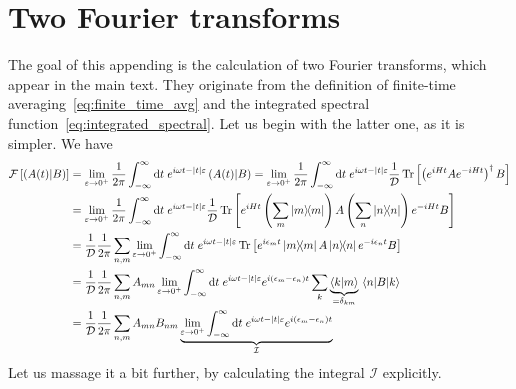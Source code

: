 \chapter{Two Fourier transforms\label{app:fourier}}
\thispagestyle{chapterBeginStyle}
The goal of this appending is the calculation of two Fourier transforms, which appear in the main text.
They originate from the definition of finite-time averaging~\eqref{eq:finite_time_avg} and
the integrated spectral function~\eqref{eq:integrated_spectral}. Let us begin with the latter one,
as it is simpler. We have
\begin{align}
    \mathcal{F}\left[\hs{A(t)}{B}\right] &= \lim _{\varepsilon \to 0^+} \frac{1}{2 \pi} \int_{-\infty}^{\infty} \mathrm{d} t 
    \; e^{i \omega t-|t| \varepsilon}\hs{A(t)}{B} = \lim _{\varepsilon \to 0^+} \frac{1}{2 \pi}
    \int_{-\infty}^{\infty} \mathrm{d} t \; e^{i \omega t-|t| \varepsilon} \frac{1}{\dimension}
    \Tr\left[\left(e^{iHt}Ae^{-iHt}\right)^{\dagger}B\right] \nonumber\\
    &=\lim _{\varepsilon \to 0^+} \frac{1}{2 \pi}
    \int_{-\infty}^{\infty} \mathrm{d} t \; e^{i \omega t-|t| \varepsilon} \frac{1}{\dimension}
    \Tr\left[e^{iHt}\left(\sum_{m} \ketbra{m}{m}\right) 
    A\left(\sum_{n} \ketbra{n}{n}\right)e^{-iHt}B\right] \nonumber\\
    &= \frac{1}{\dimension} \frac{1}{2 \pi}\sum_{n,m} \lim _{\varepsilon \to 0^+} 
    \int_{-\infty}^{\infty} \mathrm{d} t \; e^{i \omega t-|t| \varepsilon}
    \Tr\left[e^{i \epsilon_m t}\ketbra{m}{m} A\ketbra{n}{n}e^{-i \epsilon_n t}B\right] \nonumber\\
    &= \frac{1}{\dimension} \frac{1}{2 \pi}\sum_{n,m} A_{mn}  \lim _{\varepsilon \to 0^+} 
    \int_{-\infty}^{\infty} \mathrm{d} t \; e^{i \omega t-|t| \varepsilon}e^{i (\epsilon_m-\epsilon_n) t}
    \sum_{k} \underbrace{\braket{k}{m}}_{=\delta_{km}} \matrixel{n}{B}{k} \nonumber\\
    &= \frac{1}{\dimension} \frac{1}{2 \pi}\sum_{n,m} A_{mn} B_{nm}  \underbrace{\lim _{\varepsilon 
    \to 0^+} \int_{-\infty}^{\infty} \mathrm{d} t \; e^{i \omega t-|t| 
    \varepsilon}e^{i (\epsilon_m-\epsilon_n) t}}_{\mathcal{I}}\label{eq:spectral function simplified}
\end{align}
Let us massage it a bit further, by calculating the integral \(\mathcal{I}\) explicitly.
